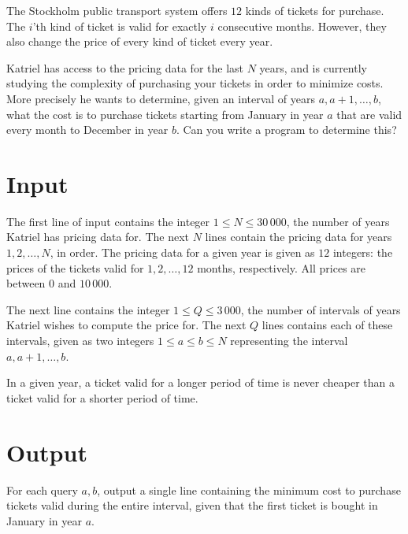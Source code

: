 The Stockholm public transport system offers $12$ kinds of tickets for purchase.
The $i$'th kind of ticket is valid for exactly $i$ consecutive months.
However, they also change the price of every kind of ticket every year.

Katriel has access to the pricing data for the last $N$ years, and is currently studying the complexity of purchasing your tickets in order to minimize costs.
More precisely he wants to determine, given an interval of years $a, a + 1, \dots, b$, what the cost is to purchase tickets starting from January in year $a$ that are valid every month to December in year $b$.
Can you write a program to determine this?

\section*{Input}
The first line of input contains the integer $1 \le N \le 30\,000$, the number of years Katriel has pricing data for.
The next $N$ lines contain the pricing data for years $1, 2, \dots, N$, in order.
The pricing data for a given year is given as $12$ integers: the prices of the tickets valid for $1, 2, \dots, 12$ months, respectively.
All prices are between $0$ and $10\,000$.

The next line contains the integer $1 \le Q \le 3\,000$, the number of intervals of years Katriel wishes to compute the price for.
The next $Q$ lines contains each of these intervals, given as two integers $1 \le a \le b \le N$ representing the interval $a, a + 1, \dots, b$.

In a given year, a ticket valid for a longer period of time is never cheaper than a ticket valid for a shorter period of time.

\section*{Output}
For each query $a, b$, output a single line containing the minimum cost to purchase tickets valid during the entire interval, given that the first ticket is bought in January in year $a$.
